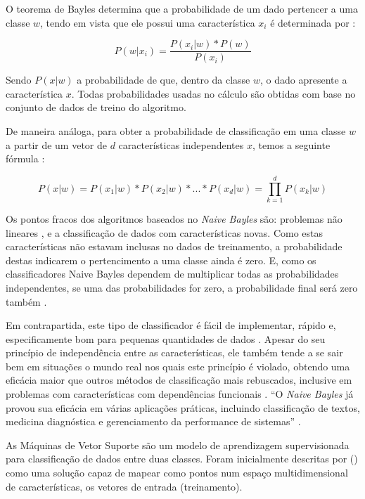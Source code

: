 \documentclass[
	12pt,				%
	openright,			%
	oneside,			%
	a4paper,			%
	english,			%
	spanish,			%
	brazil				%
	]{abntex2}
\begin{document}
	O teorema de Bayles determina que a probabilidade de um dado pertencer a uma classe $w$, tendo em vista que ele	possui uma característica $x_i$ é determinada por \cite{raschka}:
	
	\[ P(w | x_i) = \frac{P(x_i | w)*P(w)}{P(x_i)} \]
	
	Sendo $P(x|w)$ a probabilidade de que, dentro da classe $w$, o dado apresente a característica $x$. Todas probabilidades usadas no cálculo são obtidas com base no conjunto de dados de treino do algoritmo. 
	
	De maneira análoga, para obter a probabilidade de classificação em uma classe $w$ a partir de um vetor de $d$ características independentes \textbf{$x$}, temos a seguinte fórmula  \cite{raschka}:
	
	\[ P(x|w) = P(x_1 | w) * P(x_2 | w) * ... * P(x_d | w) = \prod\limits_{k=1}^d P(x_k | w) \] 
	 
		
	Os pontos fracos dos algoritmos baseados no \emph{Naive Bayles} são: problemas não lineares \cite{raschka}, e a classificação de dados com características novas. Como estas características não estavam inclusas no dados de treinamento, a probabilidade destas indicarem o pertencimento a uma classe ainda é zero. E, como os classificadores Naive Bayles dependem de multiplicar todas as probabilidades independentes, se uma das probabilidades for zero, a probabilidade final será zero também \cite{kirk}.
	
	Em contrapartida, este tipo de classificador é fácil de implementar, rápido e, especificamente bom para pequenas quantidades de dados \cite{raschka}. Apesar do seu princípio de independência entre as características, ele também tende a se sair bem em situações o mundo real nos quais este princípio é violado, obtendo uma eficácia maior que outros métodos de classificação mais rebuscados, inclusive em problemas com características com dependências funcionais \cite{rish}. ``O \emph{Naive Bayles} já provou sua eficácia em várias aplicações práticas, incluindo classificação de textos, medicina diagnóstica e gerenciamento da performance de sistemas'' \cite{rish}. 


	As Máquinas de Vetor Suporte são um modelo de aprendizagem supervisionada para classificação de dados entre duas classes. Foram inicialmente descritas por \citeauthor{cortes} (\citeyear{cortes}) como uma solução capaz de mapear como pontos num espaço multidimensional de características, os vetores de entrada (treinamento). 
	
\end{document}
